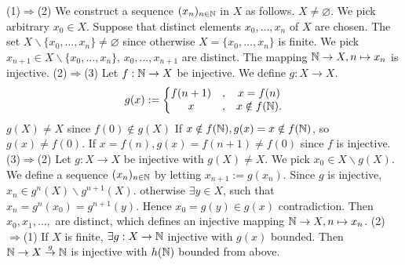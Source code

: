\begin{proofenv}
    \quad
    \newline
    (1)$\Rightarrow$(2) We construct a sequence $(x_n)_{n\in \mathbb{N}}$ in $X$ as follows. $X\not=\varnothing$. We pick arbitrary $x_0\in X$. Suppose that distinct elements $x_0, \dots,  x_n$ of $X$ are chosen. The set $X\backslash\{x_0, \dots, x_n\}\not=\varnothing$ since otherwise $X=\{x_0, \dots, x_n\}$ is finite. We pick $x_{n+1}\in X\backslash\{x_0, \dots, x_n\}, \,  x_0, \dots, x_{n+1}$ are distinct. The mapping $\mathbb{N}\rightarrow X,  n\mapsto x_n$ is injective.
    \newline
    (2)$\Rightarrow$(3) Let $f:\mathbb{N}\rightarrow X$ be injective. We define $g:X\rightarrow X$.
    $$g(x):=
\left\{\begin{matrix}
 f(n+1)&,  &x=f(n) \\
x&, &x\notin f(\mathbb{N}).
\end{matrix}\right. $$
$g(X)\not=X$ since $f(0)\notin g(X)$ If $x\notin f(\mathbb{N}), g(x)=x\notin f(\mathbb{N})$,  so $g(x)\not=f(0)$. If $x=f(n),  g(x)=f(n+1)\not=f(0)$ since $f$ is injective.
\newline
(3)$\Rightarrow$(2) Let $g:X\rightarrow X$ be injective with $g(X)\not=X$. We pick $x_0\in X\backslash g(X)$. We define a sequence $(x_n)_{n\in\mathbb{N}}$ by letting $x_{n+1}:=g(x_n)$. Since $g$ is injective,  $x_n\in g^n(X)\backslash g^{n+1}(X)$. otherwise $\exists y\in X$,  such that $x_n=g^{n}(x_0)=g^{n+1}(y)$. Hence $x_0=g(y)\in g(x)$ contradiction. Then $x_0, x_1, \dots, $ are distinct,  which defines an injective mapping $\mathbb{N}\rightarrow X, n\mapsto x_n$.
\newline
(2)$\Rightarrow$(1) If $X$ is finite,  $\exists g:X\rightarrow\mathbb{N}$ injective with $g(x)$ bounded. Then $\mathbb{N}\rightarrow X\overset{g}{\rightarrow}\mathbb{N}$ is injective with $h(\mathbb{N})$ bounded from above.
\end{proofenv}